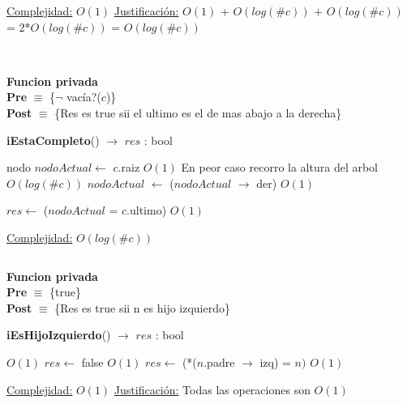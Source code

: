 \begin{Algoritmos}
\begin{algorithm}[H]
\begin{algorithmic}[1]
    \medskip
    \Statex \underline{Complejidad:} $O(1)$
    \Statex \underline{Justificaci\'on:} $O(1)$ + $O(log(\#c))$ + $O(log(\#c))$ = 2*$O(log(\#c))$ = $O(log(\#c))$
\end{algorithmic}
\end{algorithm}






$ $\newline
$ $\newline

\textbf{Funcion privada}\\
\textbf{Pre} $\equiv$ \{$\neg$ vac\'ia?($c$)\}\\%
\textbf{Post} $\equiv$ \{Res es true sii el ultimo es el de mas abajo a la derecha\}%
\begin{algorithm}[H]
{\textbf{iEstaCompleto}() $\to$ $res$ : bool}
\begin{algorithmic}[1]

    \State nodo $nodoActual \gets$ $c$.raiz \Comment $O(1)$
     \Comment En peor caso recorro la altura del arbol $O(log(\#c))$
        \State $nodoActual$ $\gets$ ($nodoActual$ $\rightarrow$ der) \Comment $O(1)$
    \EndWhile

    \State $res \gets$ ($nodoActual$ = $c$.ultimo) $O(1)$

    \medskip
    \Statex \underline{Complejidad:} $O(log(\#c))$
\end{algorithmic}
\end{algorithm}


$ $\newline

\textbf{Funcion privada}\\
\textbf{Pre} $\equiv$ \{true\}\\%
\textbf{Post} $\equiv$ \{Res es true sii n es hijo izquierdo\}%
\begin{algorithm}[H]
{\textbf{iEsHijoIzquierdo}() $\to$ $res$ : bool}
\begin{algorithmic}[1]
    
     \Comment $O(1)$
        \State $res \gets$ false \Comment $O(1)$
    \Else
        \State $res \gets $ (*($n$.padre $\to$ izq) = $n)$ \Comment $O(1)$
    \EndIf

    \medskip
    \Statex \underline{Complejidad:} $O(1)$
    \Statex \underline{Justificaci\'on:} Todas las operaciones son $O(1)$
\end{algorithmic}
\end{algorithm}



\end{Algoritmos}
